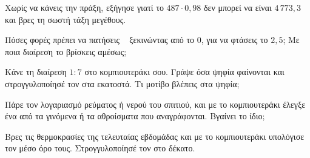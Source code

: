 \ex Χωρίς να κάνεις την πράξη, εξήγησε γιατί το $487\cdot0{,}98$ δεν μπορεί να είναι $4\,773{,}3$ και βρες τη σωστή τάξη μεγέθους.

\ex Πόσες φορές πρέπει να πατήσεις \kpl\  \kis{} ξεκινώντας από το $0$, για να φτάσεις το $2{,}5$; Με ποια διαίρεση το βρίσκεις αμέσως;

\ex Κάνε τη διαίρεση $1:7$ στο κομπιουτεράκι σου. Γράψε όσα ψηφία φαίνονται και στρογγυλοποίησέ τον στα εκατοστά. Τι μοτίβο βλέπεις στα ψηφία;


\ex Πάρε τον λογαριασμό ρεύματος ή νερού του σπιτιού, και με το κομπιουτεράκι έλεγξε ένα από τα γινόμενα ή τα αθροίσματα που αναγράφονται. Βγαίνει το ίδιο;

\ex Βρες τις θερμοκρασίες της τελευταίας εβδομάδας και με το κομπιουτεράκι υπολόγισε τον μέσο όρο τους. Στρογγυλοποίησέ τον στο δέκατο.
